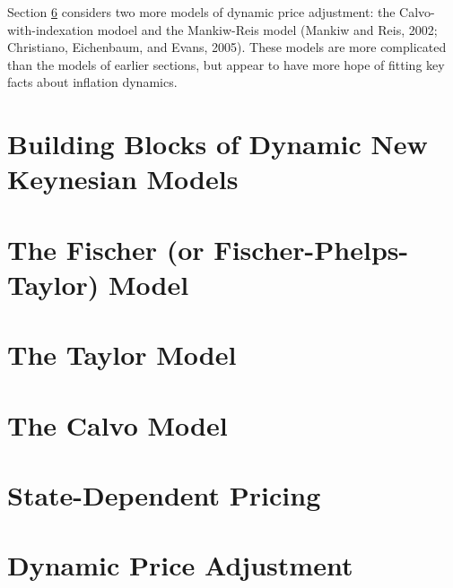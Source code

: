\documentclass[10pt]{article}
\begin{document}
Section \ref{sec:dynamic_price_adjustment} considers two more models of dynamic price adjustment:
the Calvo-with-indexation modoel and the Mankiw-Reis model (Mankiw and Reis, 2002;
Christiano, Eichenbaum, and Evans, 2005). These models are more complicated than the models of 
earlier sections, but appear to have more hope of fitting key facts about inflation dynamics.


\section{Building Blocks of Dynamic New Keynesian Models} \label{sec:DNK}
\section{The Fischer (or Fischer-Phelps-Taylor) Model} \label{sec:Fischer}
\section{The Taylor Model} \label{sec:Taylor}
\section{The Calvo Model} \label{sec:Calvo}
\section{State-Dependent Pricing} \label{sec:state-dependent}
\section{Dynamic Price Adjustment} \label{sec:dynamic_price_adjustment}
















\end{document}
